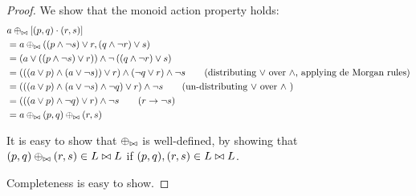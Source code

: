 \lsuperpose*
\begin{proof}
  \label{prf:lsuperpose}
  We show that the monoid action property holds:
  \begin{align*}
    &a \oplus_{\bowtie} \left[(p, q) \cdot (r, s)\right]\\
    &= a \oplus_{\bowtie} ((p \wedge \neg s) \vee r, (q \wedge \neg r) \vee s)\\
    &= \left(
      a \vee
      \left(
        \left(
          p \wedge \neg s
        \right)
        \vee r
      \right)
    \right)
    \wedge \neg
    \left(
      \left(
        q \wedge \neg r
      \right)
      \vee s
    \right)\\
    &= \left(
      \left(
        \left(
          a \vee p
        \right)
        \wedge
        \left(
          a \vee \neg s
        \right)
      \right)
      \vee r
    \right)
    \wedge
    \left(
      \neg q \vee r
    \right)
    \wedge
    \neg s
    \tag{distributing $\vee$ over $\wedge$, applying de Morgan rules}\\
    &= \left(
      \left(
        \left(
          a \vee p
        \right)
        \wedge
        \left(
          a \vee \neg s
        \right)
        \wedge
        \neg q
      \right)
      \vee r
    \right)
    \wedge
    \neg s
    \tag{un-distributing $\vee$ over $\wedge$ }\\
    &= \left(
      \left(
        \left(
          a \vee p
        \right)
        \wedge
        \neg q
      \right)
      \vee r
    \right)
    \wedge
    \neg s
    \tag{$r \rightarrow \neg s$}\\
    &= a \oplus_{\bowtie} (p, q) \oplus_{\bowtie} (r, s)
  \end{align*}

  It is easy to show that $\oplus_{\bowtie}$ is well-defined, by showing that $(p,q)
  \oplus_{\bowtie} (r, s) \in L \bowtie L$ if $(p, q), (r,s) \in L \bowtie L$.

  Completeness is easy to show.
\end{proof}

